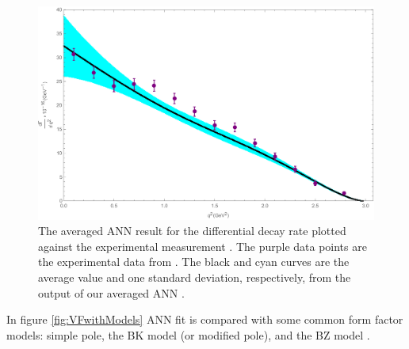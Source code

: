\begin{figure}[H]
\begin{center}
\includegraphics[scale=0.4]{FF exp final PDisVF_NN.pdf}
\caption{The averaged ANN result for the differential decay rate plotted against the experimental measurement \cite{Grant:2019yar}. The purple data points are the experimental data from \cite{Ablikim:2015ixa}. 
The black and cyan curves are the average value and one standard deviation, respectively, from the output of our averaged ANN .}
\label{fig:diffGamma}
\end{center}
\end{figure}
\vspace{-10mm}
In figure \ref{fig:VFwithModels} ANN fit is compared with some common form factor models: simple pole, the BK model (or modified pole), and the BZ model \cite{Becirevic:1999kt, Ball:2004ye} . 
%

